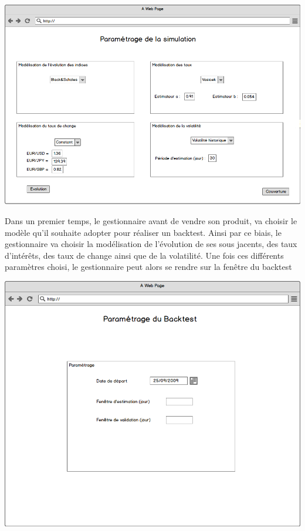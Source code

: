 \documentclass[french,12pt,a4paper]{article}
\begin{document}
\begin{center}
\includegraphics[scale=0.4]{../Images/Maquette_3.png}
\end{center}

Dans un premier temps, le gestionnaire avant de vendre son produit, va choisir le modèle qu'il souhaite adopter pour réaliser un backtest. Ainsi par ce biais, le gestionnaire va choisir la modélisation de l'évolution de ses sous jacents, des taux d'intérêts, des taux de change ainsi que de la volatilité. Une fois ces différents paramètres choisi, le gestionnaire peut alors se rendre sur la fenêtre du backtest


\begin{center}
\includegraphics[scale=0.4]{../Images/Maquette_7.png}
\end{center} 
 
\end{document}
